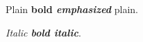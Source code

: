 \documentclass{article}
\begin{document}
Plain \textbf{bold \emph{emphasized}} plain.

\textit{Italic \textbf{bold italic}}.
\end{document}
